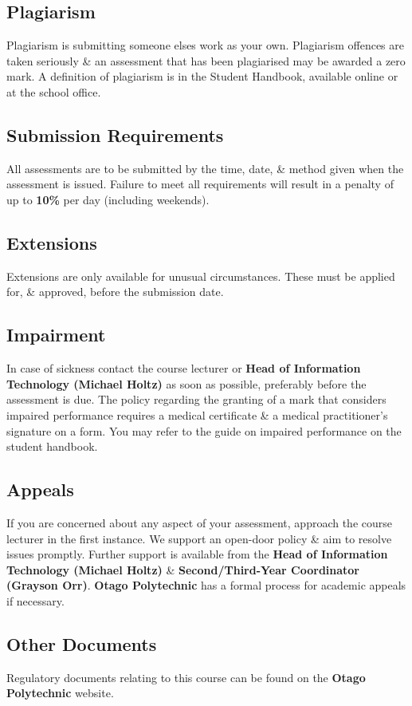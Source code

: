 \documentclass{article}
\begin{document}
\subsection*{Plagiarism}
Plagiarism is submitting someone elses work as your own. Plagiarism offences are taken seriously \& an assessment that has been plagiarised may be awarded a zero mark. A definition of plagiarism is in the Student Handbook, available online or at the school office.

\subsection*{Submission Requirements}
All assessments are to be submitted by the time, date, \& method given when the assessment is issued. Failure to meet all requirements will result in a penalty of up to \textbf{10\%} per day (including weekends).

\subsection*{Extensions}
Extensions are only available for unusual circumstances. These must be applied for, \& approved, before the submission date.

\subsection*{Impairment}
In case of sickness contact the course lecturer or \textbf{Head of Information Technology (Michael Holtz)} as soon as possible, preferably before the assessment is due. The policy regarding the granting of a mark that considers impaired performance requires a medical certificate \& a medical practitioner’s signature on a form. You may refer to the guide on impaired performance on the student handbook.

\subsection*{Appeals}
If you are concerned about any aspect of your assessment, approach the course lecturer in the first instance. We support an open-door policy \& aim to resolve issues promptly. Further support is available from the \textbf{Head of Information Technology (Michael Holtz)} \& \textbf{Second/Third-Year Coordinator (Grayson Orr)}. \textbf{Otago Polytechnic} has a formal process for academic appeals if necessary.

\subsection*{Other Documents}
Regulatory documents relating to this course can be found on the \textbf{Otago Polytechnic} website.
\end{document}
